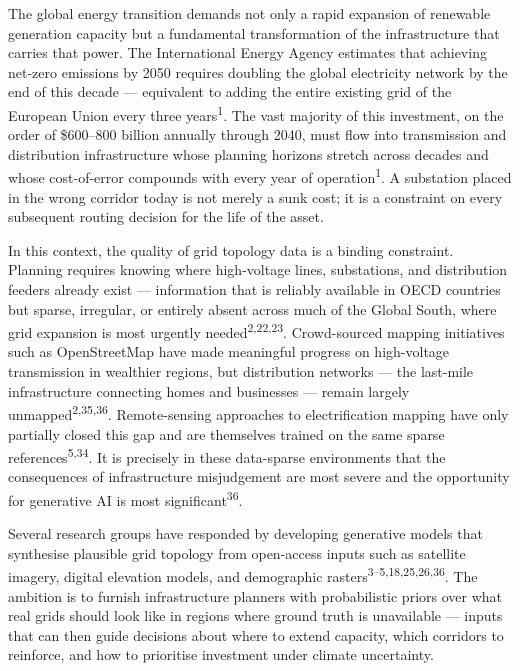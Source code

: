 \documentclass[10pt,a4paper]{article}
\begin{document}
The global energy transition demands not only a rapid expansion of
renewable generation capacity but a fundamental transformation of
the infrastructure that carries that power. The International
Energy Agency estimates that achieving net-zero emissions by 2050
requires doubling the global electricity network by the end of this
decade --- equivalent to adding the entire existing grid of the
European Union every three years\textsuperscript{1}. The vast
majority of this investment, on the order of \$600--800 billion
annually through 2040, must flow into transmission and
distribution infrastructure whose planning horizons stretch across
decades and whose cost-of-error compounds with every year of
operation\textsuperscript{1}. A substation placed in the wrong
corridor today is not merely a sunk cost; it is a constraint on
every subsequent routing decision for the life of the asset.

In this context, the quality of grid topology data is a binding
constraint. Planning requires knowing where high-voltage lines,
substations, and distribution feeders already exist ---
information that is reliably available in OECD countries but
sparse, irregular, or entirely absent across much of the Global
South, where grid expansion is most urgently needed\textsuperscript{2,22,23}.
Crowd-sourced mapping initiatives such as OpenStreetMap have made
meaningful progress on high-voltage transmission in wealthier
regions, but distribution networks --- the last-mile infrastructure
connecting homes and businesses --- remain largely unmapped\textsuperscript{2,35,36}.
Remote-sensing approaches to electrification mapping have only
partially closed this gap and are themselves trained on the same
sparse references\textsuperscript{5,34}. It is precisely in these
data-sparse environments that the consequences of infrastructure
misjudgement are most severe and the opportunity for generative AI is
most significant\textsuperscript{36}.

Several research groups have responded by developing generative
models that synthesise plausible grid topology from open-access
inputs such as satellite imagery, digital elevation models, and
demographic rasters\textsuperscript{3--5,18,25,26,36}. The ambition is to
furnish infrastructure planners with probabilistic priors over
what real grids should look like in regions where ground truth is
unavailable --- inputs that can then guide decisions about where
to extend capacity, which corridors to reinforce, and how to
prioritise investment under climate uncertainty.
\end{document}
